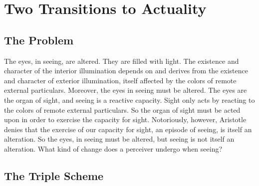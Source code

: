 \chapter{Two Transitions to Actuality} %
\label{cha:two_kinds_of_potentiality}

\section{The Problem} %
\label{sec:the_problem}

The eyes, in seeing, are altered. They are filled with light. The existence and character of the interior illumination depends on and derives from the existence and character of exterior illumination, itself affected by the colors of remote external particulars. Moreover, the eyes in seeing must be altered. The eyes are the organ of sight, and seeing is a reactive capacity. Sight only acts by reacting to the colors of remote external particulars. So the organ of sight must be acted upon in order to exercise the capacity for sight. Notoriously, however, Aristotle denies that the exercise of our capacity for sight, an episode of seeing, is itself an alteration. So the eyes, in seeing must be altered, but seeing is not itself an alteration. What kind of change does a perceiver undergo when seeing?


\section{The Triple Scheme} %
\label{sec:the_triple_scheme}

